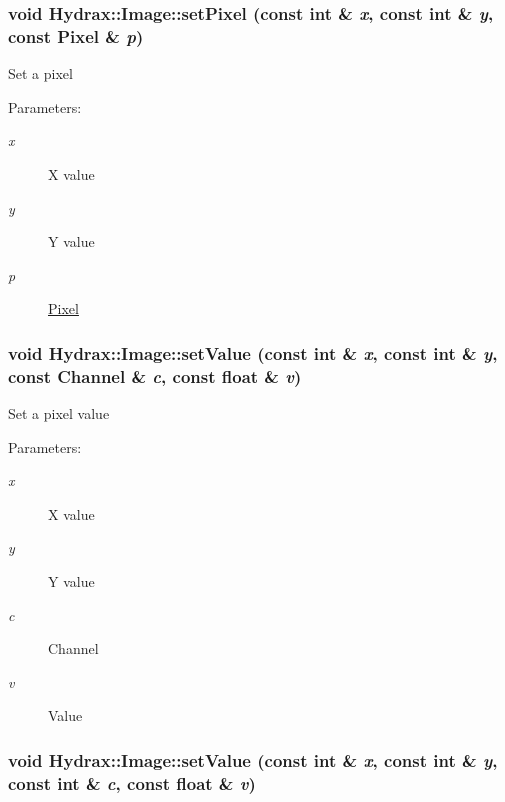 \begin{CompactItemize}
{\subsubsection[{setPixel}]{\setlength{\rightskip}{0pt plus 5cm}void Hydrax::Image::setPixel (const int \& {\em x}, \/  const int \& {\em y}, \/  const {\bf Pixel} \& {\em p})}}
\label{class_hydrax_1_1_image_57b7ae07e51805b2744b5d21c0412ecd}


Set a pixel \begin{Desc}
\item[Parameters:]
\begin{description}
\item[{\em x}]X value \item[{\em y}]Y value \item[{\em p}]\hyperlink{struct_hydrax_1_1_image_1_1_pixel}{Pixel} \end{description}
\end{Desc}
\hypertarget{class_hydrax_1_1_image_51f4bfd3291592dac969f51c52ca1009}{
\subsubsection[{setValue}]{\setlength{\rightskip}{0pt plus 5cm}void Hydrax::Image::setValue (const int \& {\em x}, \/  const int \& {\em y}, \/  const {\bf Channel} \& {\em c}, \/  const float \& {\em v})}}
\label{class_hydrax_1_1_image_51f4bfd3291592dac969f51c52ca1009}


Set a pixel value \begin{Desc}
\item[Parameters:]
\begin{description}
\item[{\em x}]X value \item[{\em y}]Y value \item[{\em c}]Channel \item[{\em v}]Value \end{description}
\end{Desc}
\hypertarget{class_hydrax_1_1_image_ddfd822a7b6663233d1bb1c3e691bb50}{
\subsubsection[{setValue}]{\setlength{\rightskip}{0pt plus 5cm}void Hydrax::Image::setValue (const int \& {\em x}, \/  const int \& {\em y}, \/  const int \& {\em c}, \/  const float \& {\em v})}}
\label{class_hydrax_1_1_image_ddfd822a7b6663233d1bb1c3e691bb50}



\end{CompactItemize}
